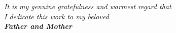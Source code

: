 \begin{center}
  
    \vspace*{\fill}
  \itshape {\large{It is my genuine gratefulness and warmest regard that \\I dedicate this work to my beloved} \\ 
 \vspace{5mm}
 \Large{ \bfseries{Father and Mother}}}
    \vspace*{\fill}
\end{center}
\clearpage
